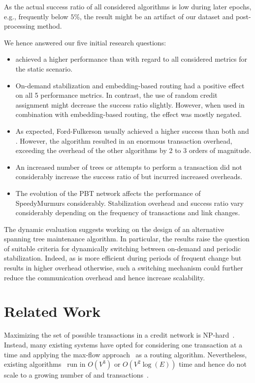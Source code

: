 As the actual success ratio of all considered algorithms is low during later epochs, e.g., frequently below $5$\%, the result might be an artifact of our dataset and post-processing method. 

We hence answered our five initial research questions: 
\begin{itemize}%
\item \oursys achieved a higher performance than \cnsysname with regard to all considered metrics for the static  scenario. 
\item On-demand stabilization and embedding-based routing had a positive effect on all 5 performance metrics. In contrast, the use of random credit assignment might decrease the success ratio slightly. However, when used in combination with embedding-based routing, the effect was mostly negated.
\item As expected, Ford-Fulkerson usually achieved a higher success than both \oursys and \cnsysname . However, the algorithm resulted in an enormous transaction overhead, exceeding the overhead of the other algorithms by 2 to 3 orders of magnitude. 
\item An increased number of trees or attempts to perform a transaction did not considerably increase the success ratio  of \oursys but incurred increased overheads.
\item The evolution of the PBT network affects the performance of SpeedyMurmurs considerably. Stabilization overhead and success ratio vary considerably depending on the frequency of transactions and link changes. 
\end{itemize}
 The dynamic evaluation suggests working on the design of an alternative spanning tree maintenance algorithm.
 In particular, the results raise the question of suitable criteria for dynamically switching between on-demand and periodic stabilization. Indeed, as \cnsysname is more efficient during periods of frequent change but results in higher overhead otherwise, such a switching mechanism could further reduce the communication overhead and hence increase scalability.
 
   

\section{Related Work}
\label{sec:related}

Maximizing the set of possible transactions in a credit network is NP-hard~\cite{Ghosh07}. 
Instead, many existing systems have opted for considering one transaction at a time and 
applying the max-flow approach~\cite{ford1956maximal} as a routing algorithm.   
Nevertheless, existing algorithms~\cite{max-flow-v2} run in $O(V^3)$ or $O(V^2 \log(E))$ time and 
hence do not scale to a growing number of \users and transactions~\cite{viswanath2012canal, post2011bazaar}. 

